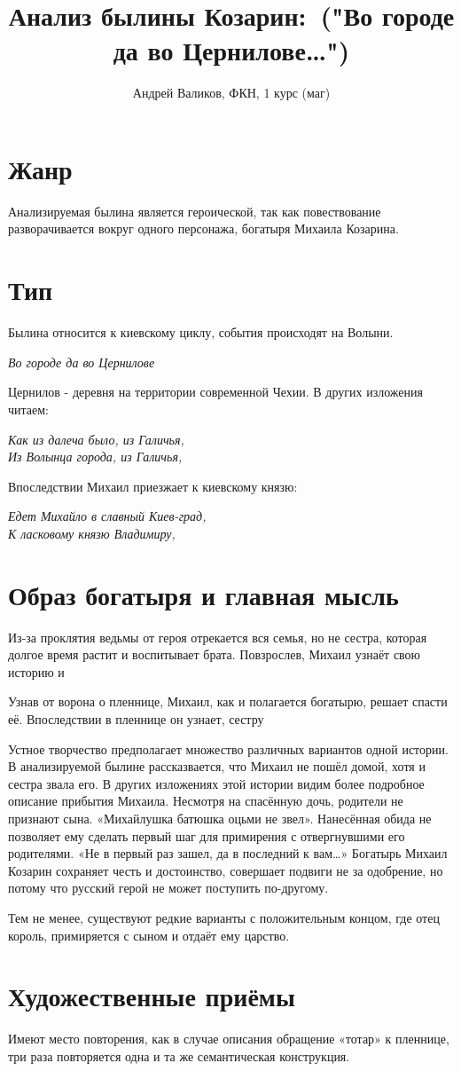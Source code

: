 \documentclass[12pt]{article}
\begin{document}
\title{Анализ былины \guillemotleft Козарин: ("Во городе да во Цернилове\ldots") \guillemotright}
\author{Андрей Валиков, ФКН, 1 курс (маг)}
\date{}
\maketitle

\section{Жанр}
Анализируемая былина является героической, так как повествование разворачивается вокруг одного персонажа, богатыря Михаила Козарина.

\section{Тип}
Былина относится к киевскому циклу, события происходят на Волыни.
\begin{center}
\textit{Во городе да во Цернилове}
\end{center}
Цернилов - деревня на территории современной Чехии. В других изложения читаем:

\begin{center}
\textit{Как из далеча было, из Галичья, \\
Из Волынца города, из Галичья,}
\end{center}
Впоследствии Михаил приезжает к киевскому князю:

\begin{center}
\textit{Едет Михайло в славный Киев-град, \\
К ласковому князю Владимиру,}
\end{center}





\section{Образ богатыря и главная мысль}
Из-за проклятия ведьмы от героя отрекается вся семья, но не сестра, которая долгое время растит и воспитывает брата. Повзрослев, Михаил узнаёт свою историю и

Узнав от ворона о пленнице, Михаил, как и полагается богатырю, решает спасти её. Впоследствии в пленнице он узнает, сестру

Устное творчество предполагает множество различных вариантов одной истории. В анализируемой былине рассказвается, что Михаил не пошёл домой, хотя и сестра звала его. В других изложениях этой истории видим более подробное описание прибытия Михаила. Несмотря на спасённую дочь, родители не признают сына. « Михайлушка батюшка оцьми не звел». Нанесённая обида не позволяет ему сделать первый шаг для примирения с отвергнувшими его родителями. «Не в первый раз зашел, да в последний к вам\ldots» Богатырь Михаил Козарин сохраняет честь и достоинство, совершает подвиги не за одобрение, но потому что русский герой не может поступить по-другому.

Тем не менее, существуют редкие варианты с положительным концом, где отец король, примиряется с сыном и отдаёт ему царство. 

\section{Художественные приёмы}

Имеют место повторения, как в случае описания обращение «тотар» к пленнице, три раза повторяется одна и та же семантическая конструкция.
\end{document}
